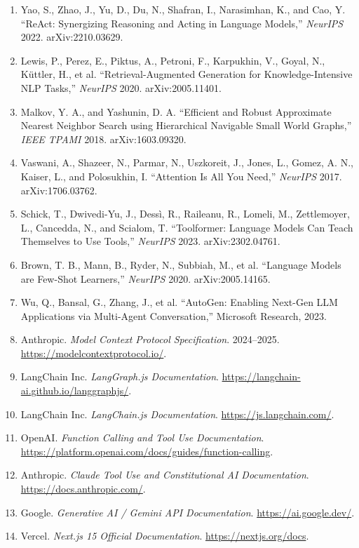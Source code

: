 \documentclass[11pt,a4paper]{report}
\begin{document}
\begin{enumerate}
  \item Yao, S., Zhao, J., Yu, D., Du, N., Shafran, I., Narasimhan, K., and Cao, Y. ``ReAct: Synergizing Reasoning and Acting in Language Models,'' \emph{NeurIPS} 2022. arXiv:2210.03629.
  \item Lewis, P., Perez, E., Piktus, A., Petroni, F., Karpukhin, V., Goyal, N., K\"uttler, H., et al. ``Retrieval-Augmented Generation for Knowledge-Intensive NLP Tasks,'' \emph{NeurIPS} 2020. arXiv:2005.11401.
  \item Malkov, Y. A., and Yashunin, D. A. ``Efficient and Robust Approximate Nearest Neighbor Search using Hierarchical Navigable Small World Graphs,'' \emph{IEEE TPAMI} 2018. arXiv:1603.09320.
  \item Vaswani, A., Shazeer, N., Parmar, N., Uszkoreit, J., Jones, L., Gomez, A. N., Kaiser, L., and Polosukhin, I. ``Attention Is All You Need,'' \emph{NeurIPS} 2017. arXiv:1706.03762.
  \item Schick, T., Dwivedi-Yu, J., Dess\`i, R., Raileanu, R., Lomeli, M., Zettlemoyer, L., Cancedda, N., and Scialom, T. ``Toolformer: Language Models Can Teach Themselves to Use Tools,'' \emph{NeurIPS} 2023. arXiv:2302.04761.
  \item Brown, T. B., Mann, B., Ryder, N., Subbiah, M., et al. ``Language Models are Few-Shot Learners,'' \emph{NeurIPS} 2020. arXiv:2005.14165.
  \item Wu, Q., Bansal, G., Zhang, J., et al. ``AutoGen: Enabling Next-Gen LLM Applications via Multi-Agent Conversation,'' Microsoft Research, 2023.
  \item Anthropic. \emph{Model Context Protocol Specification}. 2024--2025. \url{https://modelcontextprotocol.io/}.
  \item LangChain Inc. \emph{LangGraph.js Documentation}. \url{https://langchain-ai.github.io/langgraphjs/}.
  \item LangChain Inc. \emph{LangChain.js Documentation}. \url{https://js.langchain.com/}.
  \item OpenAI. \emph{Function Calling and Tool Use Documentation}. \url{https://platform.openai.com/docs/guides/function-calling}.
  \item Anthropic. \emph{Claude Tool Use and Constitutional AI Documentation}. \url{https://docs.anthropic.com/}.
  \item Google. \emph{Generative AI / Gemini API Documentation}. \url{https://ai.google.dev/}.
  \item Vercel. \emph{Next.js 15 Official Documentation}. \url{https://nextjs.org/docs}.

\end{enumerate}
\end{document}
